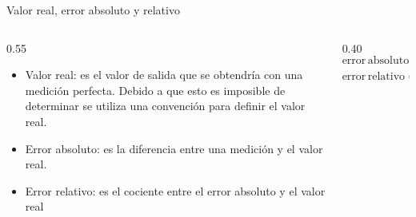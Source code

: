 \documentclass[aspectratio=169]{beamer}
\begin{document}
\begin{frame}{Valor real, error absoluto y relativo}
    \begin{columns}[c, onlytextwidth]
        \begin{column}{0.55\textwidth}
            \begin{itemize}
                \item Valor real: es el valor de salida que se obtendría con una medición perfecta. Debido a que esto es imposible de determinar se utiliza una convención para definir el valor real.  
                \item Error absoluto: es la diferencia entre una medición y el valor real. 
                \item Error relativo: es el cociente entre el error absoluto y el valor real
            \end{itemize}
        \end{column}
        \begin{column}{0.40\textwidth}
            \begin{equation*}
                \mathrm{error\,absoluto} = \mathrm{medición} - \mathrm{valor\,real}
            \end{equation*}
            \begin{equation*}
                \mathrm{error\,relativo} = \dfrac{\mathrm{error\,absoluto}}{\mathrm{valor\,real}}
            \end{equation*}
        \end{column}
    \end{columns}
\end{frame}
\end{document}
